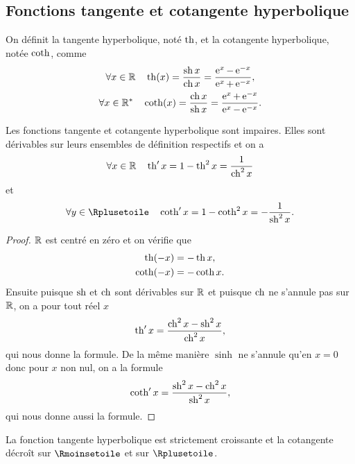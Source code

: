 \subsection{Fonctions tangente et cotangente hyperbolique}
\label{subsec:chap1-tanhetcotanh}
\begin{defdef} 
  On définit la tangente hyperbolique, noté $\operatorname{th}$, et la cotangente hyperbolique, notée $\operatorname{coth}$, comme
  \begin{gather}
    \forall x \in \mathbb{R} \quad \operatorname{th}(x)=\frac{\operatorname{sh} x}{\operatorname{ch} x}=\frac{\operatorname{e}^x - \operatorname{e}^{-x}}{\operatorname{e}^x+\operatorname{e}^{-x}}, \\
    \forall x \in \mathbb{R}^* \quad \operatorname{coth}(x)=\frac{\operatorname{ch} x}{\operatorname{sh} x}=\frac{\operatorname{e}^x + \operatorname{e}^{-x}}{\operatorname{e}^x-\operatorname{e}^{-x}}.
  \end{gather}
\end{defdef}
%
\begin{prop} 
  Les fonctions tangente et cotangente hyperbolique sont impaires. Elles sont dérivables sur leurs ensembles de définition respectifs et on a 
  \begin{equation} 
    \forall x \in \mathbb{R} \quad \operatorname{th}' x = 1-\operatorname{th}^2 x = \frac{1}{\operatorname{ch}^2 x} 
  \end{equation} 
  et 
  \begin{equation} 
    \forall y \in \Rplusetoile \quad \hcotan' x=1-\hcotan^2 x=-\frac{1}{\hsin^2 x}.
  \end{equation}
\end{prop}
\begin{proof} 
  $\mathbb{R}$ est centré en zéro et on vérifie que
  \begin{gather}
    \operatorname{th}(-x)=-\operatorname{th} x, \\ 
    \operatorname{coth}(-x) = -\operatorname{coth} x.
  \end{gather}
  Ensuite puisque $\operatorname{sh}$ et $\operatorname{ch}$ sont dérivables sur $\mathbb{R}$ et puisque $\operatorname{ch}$ ne s'annule pas sur $\mathbb{R}$, on a pour tout réel $x$ 
  \begin{equation}
    \operatorname{th}' x = \frac{\operatorname{ch}^2 x - \operatorname{sh}^2 x}{\operatorname{ch}^2 x},
  \end{equation} 
  qui nous donne la formule. De la même manière $\sinh$ ne s'annule qu'en $x=0$ donc pour $x$ non nul, on a la formule 
  \begin{equation}
    \operatorname{coth}' x = \frac{\operatorname{sh}^2 x - \operatorname{ch}^2 x}{\operatorname{sh}^2 x},
  \end{equation} 
  qui nous donne aussi la formule.
\end{proof}
La fonction tangente hyperbolique est strictement croissante et la cotangente décroît sur $\Rmoinsetoile$ et sur $\Rplusetoile$.
%
